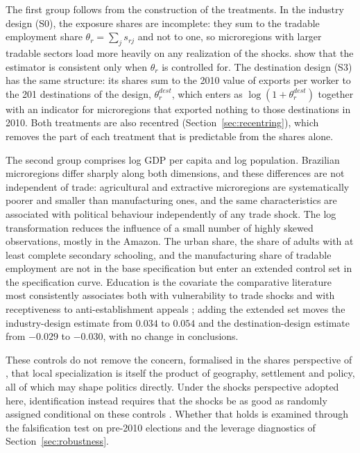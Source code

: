 \documentclass[
	11pt,				%
	oneside,			%
	a4paper,			%
	english,			%
	english				%
	]{abntex2ppgsi}
\theoremstyle{plain}
\theoremstyle{remark}
\theoremstyle{plain}%
\theoremstyle{remark}%
\begin{document}
The first group follows from the construction of the treatments. In the industry design (S0), the exposure shares are incomplete: they sum to the tradable employment share $\theta_r = \sum_j s_{rj}$ and not to one, so microregions with larger tradable sectors load more heavily on any realization of the shocks.  show that the estimator is consistent only when $\theta_r$ is controlled for. The destination design (S3) has the same structure: its shares sum to the 2010 value of exports per worker to the 201 destinations of the design, $\theta^{dest}_r$, which enters as $\log(1+\theta^{dest}_r)$ together with an indicator for microregions that exported nothing to those destinations in 2010. Both treatments are also recentred (Section~\ref{sec:recentring}), which removes the part of each treatment that is predictable from the shares alone.

The second group comprises log GDP per capita and log population. Brazilian microregions differ sharply along both dimensions, and these differences are not independent of trade: agricultural and extractive microregions are systematically poorer and smaller than manufacturing ones, and the same characteristics are associated with political behaviour independently of any trade shock. The log transformation reduces the influence of a small number of highly skewed observations, mostly in the Amazon. The urban share, the share of adults with at least complete secondary schooling, and the manufacturing share of tradable employment are not in the base specification but enter an extended control set in the specification curve. Education is the covariate the comparative literature most consistently associates both with vulnerability to trade shocks and with receptiveness to anti-establishment appeals \cite{mughan,Guriev,colantone}; adding the extended set moves the industry-design estimate from $0.034$ to $0.054$ and the destination-design estimate from $-0.029$ to $-0.030$, with no change in conclusions.

These controls do not remove the concern, formalised in the shares perspective of , that local specialization is itself the product of geography, settlement and policy, all of which may shape politics directly. Under the shocks perspective adopted here, identification instead requires that the shocks be as good as randomly assigned conditional on these controls \cite{quasi-experimental}. Whether that holds is examined through the falsification test on pre-2010 elections and the leverage diagnostics of Section~\ref{sec:robustness}.
\end{document}
